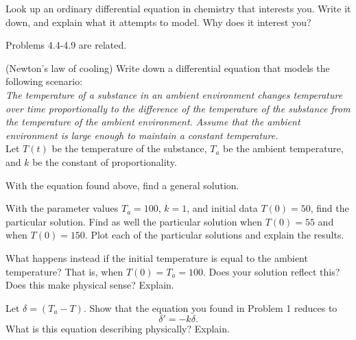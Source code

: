 \begin{problem}
    Look up an ordinary differential equation in chemistry that interests you.  Write it down, and explain what it attempts to model. Why does it interest you?
\end{problem}

\begin{center}
    Problems 4.4-4.9 are related.
\end{center}

\begin{problem}
    (Newton's law of cooling) Write down a differential equation that models the following scenario:\\

    \noindent\emph{The temperature of a substance in an ambient environment changes temperature over time proportionally to the difference of the temperature of the substance from the temperature of the ambient environment. Assume that the ambient environment is large enough to maintain a constant temperature.}\\

    \noindent Let $T(t)$ be the temperature of the substance, $T_a$ be the ambient temperature, and $k$ be the constant of proportionality.
\end{problem}

\begin{problem}
    With the equation found above, find a general solution.
\end{problem}

\begin{problem}
    With the parameter values $T_a=100$, $k=1$, and initial data $T(0)=50$, find the particular solution.  Find as well the particular solution when $T(0)=55$ and when $T(0)=150$. Plot each of the particular solutions and explain the results.
\end{problem}


\begin{problem}
    What happens instead if the initial temperature is equal to the ambient temperature? That is, when $T(0)=T_a=100$. Does your solution reflect this? Does this make physical sense? Explain.
\end{problem}

\begin{problem}
    Let $\delta = (T_a-T)$. Show that the equation you found in Problem 1 reduces to
    \[
    \delta' = -k\delta.
    \]
    What is this equation describing physically? Explain.
\end{problem}


